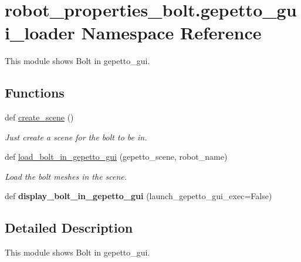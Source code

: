 \hypertarget{namespacerobot__properties__bolt_1_1gepetto__gui__loader}{}\section{robot\+\_\+properties\+\_\+bolt.\+gepetto\+\_\+gui\+\_\+loader Namespace Reference}
\label{namespacerobot__properties__bolt_1_1gepetto__gui__loader}


This module shows Bolt in gepetto\+\_\+gui.  


\subsection*{Functions}
\begin{DoxyCompactItemize}
\item 
\mbox{\label{namespacerobot__properties__bolt_1_1gepetto__gui__loader_a5d8d39b75280e377bb5b230a0283b6c7}} 
def \hyperlink{namespacerobot__properties__bolt_1_1gepetto__gui__loader_a5d8d39b75280e377bb5b230a0283b6c7}{create\+\_\+scene} ()
\begin{DoxyCompactList}\small\item\em Just create a scene for the bolt to be in. \end{DoxyCompactList}\item 
\mbox{\label{namespacerobot__properties__bolt_1_1gepetto__gui__loader_acce27d25ffff793eda1befea8fb7a7de}} 
def \hyperlink{namespacerobot__properties__bolt_1_1gepetto__gui__loader_acce27d25ffff793eda1befea8fb7a7de}{load\+\_\+bolt\+\_\+in\+\_\+gepetto\+\_\+gui} (gepetto\+\_\+scene, robot\+\_\+name)
\begin{DoxyCompactList}\small\item\em Load the bolt meshes in the scene. \end{DoxyCompactList}\item 
\mbox{\label{namespacerobot__properties__bolt_1_1gepetto__gui__loader_a3d01306696eb724d0e3489865ac0c376}} 
def {\bfseries display\+\_\+bolt\+\_\+in\+\_\+gepetto\+\_\+gui} (launch\+\_\+gepetto\+\_\+gui\+\_\+exec=False)
\end{DoxyCompactItemize}


\subsection{Detailed Description}
This module shows Bolt in gepetto\+\_\+gui. 